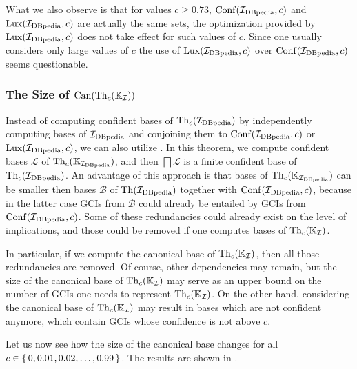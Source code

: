 What we also observe is that for values $c \geq 0.73$, $\operatorname{Conf}({\mathcal{I}_{\text{DBpedia}}}, c)$ and
$\operatorname{Lux}({\mathcal{I}_{\text{DBpedia}}}, c)$ are actually the same sets, \ie the optimization provided by
$\operatorname{Lux}({\mathcal{I}_{\text{DBpedia}}}, c)$ does not take effect for such values of $c$.  Since one usually
considers only large values of $c$ the use of $\operatorname{Lux}({\mathcal{I}_{\text{DBpedia}}}, c)$ over $\operatorname{Conf}({\mathcal{I}_{\text{DBpedia}}},
c)$ seems questionable.

\subsubsection{The Size of $\operatorname{Can}(\operatorname{Th}_c({\mathbb{K}}_{\mathcal{I}}))$}
\label{sec:size-canth_cc-k_math}

Instead of computing confident bases of $\operatorname{Th}_c({\mathcal{I}_{\text{DBpedia}}})$ by independently computing
bases of ${\mathcal{I}_{\text{DBpedia}}}$ and conjoining them to $\operatorname{Conf}({\mathcal{I}_{\text{DBpedia}}}, c)$ or $\operatorname{Lux}({\mathcal{I}_{\text{DBpedia}}}, c)$,
we can also utilize
.  In this theorem,
we compute confident bases $\mathcal{L}$ of $\operatorname{Th}_c({\mathbb{K}}_{{\mathcal{I}_{\text{DBpedia}}}})$, and then
$\bigsqcap \mathcal{L}$ is a finite confident base of $\operatorname{Th}_c({\mathcal{I}_{\text{DBpedia}}})$.  An advantage of
this approach is that bases of $\operatorname{Th}_c({\mathbb{K}}_{{\mathcal{I}_{\text{DBpedia}}}})$ can be smaller then bases
$\mathcal{B}$ of $\operatorname{Th}({\mathcal{I}_{\text{DBpedia}}})$ together with $\operatorname{Conf}({\mathcal{I}_{\text{DBpedia}}}, c)$, because in the
latter case GCIs from $\mathcal{B}$ could already be entailed by GCIs from
$\operatorname{Conf}({\mathcal{I}_{\text{DBpedia}}}, c)$.  Some of these redundancies could already exist on the level of
implications, and those could be removed if one computes bases of $\operatorname{Th}_c({\mathbb{K}}_{\mathcal{I}})$.

In particular, if we compute the canonical base of $\operatorname{Th}_c({\mathbb{K}}_{\mathcal{I}})$, then all
those redundancies are removed.  Of course, other dependencies may remain, but the size of
the canonical base of $\operatorname{Th}_c({\mathbb{K}}_{\mathcal{I}})$ may serve as an upper bound on the
number of GCIs one needs to represent $\operatorname{Th}_c({\mathbb{K}}_{\mathcal{I}})$.  On the other hand,
considering the canonical base of $\operatorname{Th}_c({\mathbb{K}}_{\mathcal{I}})$ may result in bases which
are not confident anymore, \ie which contain GCIs whose confidence is not above $c$.

Let us now see how the size of the canonical base changes for all $c \in {\ensuremath{\{\, 0, 0.01,
  0.02, \dots, 0.99 \,\}}}$.  The results are shown in .

